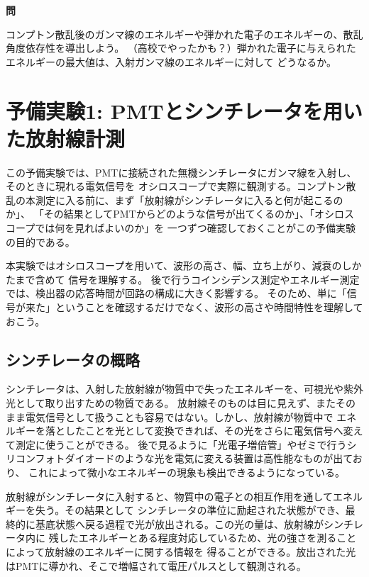 \documentclass[uplatex,dvipdfmx,12pt,nomag]{jsarticle}
\newcounter{question}
\newenvironment{questionbox}
  {%
    \refstepcounter{question}%
    \vspace{0.8em}%
    \begin{framed}%
    \noindent\textbf{問\thequestion}\par\smallskip
  }
  {%
    \end{framed}%
    \vspace{0.2em}%
  }
\begin{document}
\begin{questionbox}
コンプトン散乱後のガンマ線のエネルギーや弾かれた電子のエネルギーの、散乱角度依存性を導出しよう。
（高校でやったかも？）弾かれた電子に与えられたエネルギーの最大値は、入射ガンマ線のエネルギーに対して
どうなるか。
\end{questionbox}

\section{予備実験1: PMTとシンチレータを用いた放射線計測}

この予備実験では、PMTに接続された無機シンチレータにガンマ線を入射し、そのときに現れる電気信号を
オシロスコープで実際に観測する。コンプトン散乱の本測定に入る前に、まず「放射線がシンチレータに入ると何が起こるのか」、
「その結果としてPMTからどのような信号が出てくるのか」、「オシロスコープでは何を見ればよいのか」を
一つずつ確認しておくことがこの予備実験の目的である。

本実験ではオシロスコープを用いて、波形の高さ、幅、立ち上がり、減衰のしかたまで含めて
信号を理解する。
後で行うコインシデンス測定やエネルギー測定では、検出器の応答時間が回路の構成に大きく影響する。
そのため、単に「信号が来た」ということを確認するだけでなく、波形の高さや時間特性を理解しておこう。

\subsection{シンチレータの概略}

シンチレータは、入射した放射線が物質中で失ったエネルギーを、可視光や紫外光として取り出すための物質である。
放射線そのものは目に見えず、またそのまま電気信号として扱うことも容易ではない。しかし、放射線が物質中で
エネルギーを落としたことを光として変換できれば、その光をさらに電気信号へ変えて測定に使うことができる。
後で見るように「光電子増倍管」やゼミで行うシリコンフォトダイオードのような光を電気に変える装置は高性能なものが出ており、
これによって微小なエネルギーの現象も検出できるようになっている。

放射線がシンチレータに入射すると、物質中の電子との相互作用を通してエネルギーを失う。その結果として
シンチレータの準位に励起された状態ができ、最終的に基底状態へ戻る過程で光が放出される。この光の量は、放射線がシンチレータ内に
残したエネルギーとある程度対応しているため、光の強さを測ることによって放射線のエネルギーに関する情報を
得ることができる。放出された光はPMTに導かれ、そこで増幅されて電圧パルスとして観測される。
\end{document}
